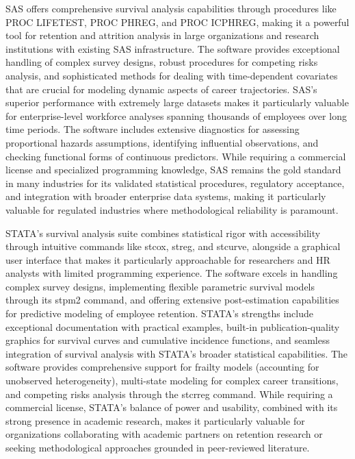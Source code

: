 \documentclass[../main.tex]{subfiles}
\begin{document}
SAS offers comprehensive survival analysis capabilities through procedures like PROC LIFETEST, PROC PHREG, and PROC ICPHREG, making it a powerful tool for retention and attrition analysis in large organizations and research institutions with existing SAS infrastructure. The software provides exceptional handling of complex survey designs, robust procedures for competing risks analysis, and sophisticated methods for dealing with time-dependent covariates that are crucial for modeling dynamic aspects of career trajectories. SAS's superior performance with extremely large datasets makes it particularly valuable for enterprise-level workforce analyses spanning thousands of employees over long time periods. The software includes extensive diagnostics for assessing proportional hazards assumptions, identifying influential observations, and checking functional forms of continuous predictors. While requiring a commercial license and specialized programming knowledge, SAS remains the gold standard in many industries for its validated statistical procedures, regulatory acceptance, and integration with broader enterprise data systems, making it particularly valuable for regulated industries where methodological reliability is paramount.

STATA's survival analysis suite combines statistical rigor with accessibility through intuitive commands like stcox, streg, and stcurve, alongside a graphical user interface that makes it particularly approachable for researchers and HR analysts with limited programming experience. The software excels in handling complex survey designs, implementing flexible parametric survival models through its stpm2 command, and offering extensive post-estimation capabilities for predictive modeling of employee retention. STATA's strengths include exceptional documentation with practical examples, built-in publication-quality graphics for survival curves and cumulative incidence functions, and seamless integration of survival analysis with STATA's broader statistical capabilities. The software provides comprehensive support for frailty models (accounting for unobserved heterogeneity), multi-state modeling for complex career transitions, and competing risks analysis through the stcrreg command. While requiring a commercial license, STATA's balance of power and usability, combined with its strong presence in academic research, makes it particularly valuable for organizations collaborating with academic partners on retention research or seeking methodological approaches grounded in peer-reviewed literature.
\end{document}
